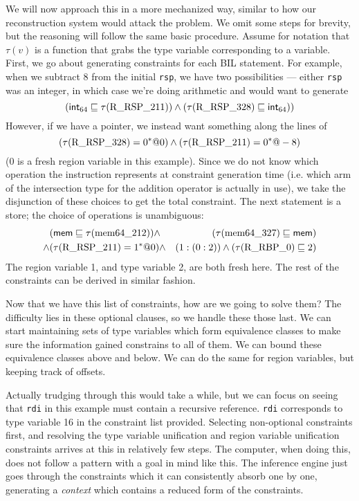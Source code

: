 We will now approach this in a more mechanized way, similar to how our reconstruction system would attack the problem. We omit some steps for brevity, but the reasoning will follow the same basic procedure. Assume for notation that $\tau(v)$ is a function that grabs the type variable corresponding to a variable. First, we go about generating constraints for each BIL statement. For example, when we subtract 8 from the initial \texttt{rsp}, we have two possibilities --- either \texttt{rsp} was an integer, in which case we're doing arithmetic and would want to generate
$$(\mathsf{int}_{64} \sqsubseteq \tau(\textrm{R\_RSP\_211})) \wedge (\tau(\textrm{R\_RSP\_328}) \sqsubseteq \mathsf{int}_{64}))$$
However, if we have a pointer, we instead want something along the lines of
$$(\tau(\textrm{R\_RSP\_328}) = 0^*@0) \wedge (\tau(\textrm{R\_RSP\_211}) = 0^*@-8)$$
(0 is a fresh region variable in this example). Since we do not know which operation the instruction represents at constraint generation time (i.e. which arm of the intersection type for the addition operator is actually in use), we take the disjunction of these choices to get the total constraint. The next statement is a store; the choice of operations is unambiguous:
\begin{align*}
& (\mathsf{mem} \sqsubseteq \tau(\textrm{mem64\_212})) \wedge& (\tau(\textrm{mem64\_327}) \sqsubseteq \mathsf{mem})\\
\wedge &(\tau(\textrm{R\_RSP\_211}) = 1^*@0) \wedge& (1 : (0 : 2)) \wedge (\tau(\textrm{R\_RBP\_0}) \sqsubseteq 2)
\end{align*}
The region variable 1, and type variable 2, are both fresh here. The rest of the constraints can be derived in similar fashion.

Now that we have this list of constraints, how are we going to solve them? The difficulty lies in these optional clauses, so we handle these those last. We can start maintaining sets of type variables which form equivalence classes to make sure the information gained constrains to all of them. We can bound these equivalence classes above and below. We can do the same for region variables, but keeping track of offsets.

Actually trudging through this would take a while, but we can focus on seeing that \texttt{rdi} in this example must contain a recursive reference. \texttt{rdi} corresponds to type variable 16 in the constraint list provided. Selecting non-optional constraints first, and resolving the type variable unification and region variable unification constraints arrives at this in relatively few steps. The computer, when doing this, does not follow a pattern with a goal in mind like this. The inference engine just goes through the constraints which it can consistently absorb one by one, generating a \emph{context} which contains a reduced form of the constraints.

